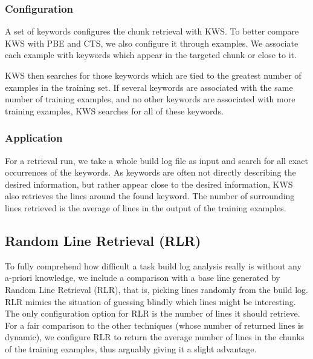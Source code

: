 \subsubsection{Configuration}
A set of keywords configures the chunk retrieval with KWS\@.
To better
compare KWS with PBE and CTS, we also configure it through examples.
We associate each example with keywords which appear in the targeted
chunk or close to it.

KWS then searches for those keywords which are tied to the greatest
number of examples in the training set.
If several keywords are associated with the same number of training
examples, and no other keywords are associated with more training
examples, KWS searches for all of these keywords.

\subsubsection{Application}
For a retrieval run, we take a whole build log file as input and
search for all exact occurrences of the keywords.
As keywords are
often not directly describing the desired information, but rather
appear close to the desired information, KWS also retrieves the lines
around the found keyword.
The number of surrounding lines retrieved is
the average of lines in the output of the training examples.


\subsection{Random Line Retrieval (RLR)}
\label{sec:expl-rlr}

To fully comprehend how difficult a task build log analysis really is without any a-priori knowledge, we include a comparison with a base line generated by Random Line Retrieval (RLR), that is,
picking lines randomly from the build log.
RLR mimics the
situation of guessing blindly which lines might be interesting.
The only configuration option for RLR is the number of lines it should
retrieve.
For a fair comparison to the other techniques (whose number of
returned lines is dynamic), we configure RLR to return the average
number of lines in the chunks of the training examples, thus arguably giving it a slight advantage.



